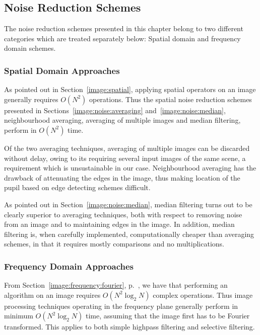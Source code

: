 \subsection{Noise Reduction Schemes}
\label{eval:eval:noise}

The noise reduction schemes presented in this chapter belong to two
different categories which are treated separately below: Spatial
domain and frequency domain schemes.

\subsubsection{Spatial Domain Approaches}

As pointed out in Section~\ref{image:spatial}, applying spatial
operators on an image generally requires $O(N^{2})$ operations.  Thus
the spatial noise reduction schemes presented in
Sections~\ref{image:noise:averaging} and~\ref{image:noise:median},
neighbourhood averaging, averaging of multiple images and median
filtering, perform in $O(N^{2})$ time.

Of the two averaging techniques, averaging of multiple images can be
discarded without delay, owing to its requiring several input images
of the same scene, a requirement which is unsustainable in our case.
Neighbourhood averaging has the drawback of attenuating the edges in
the image, thus making location of the pupil based on edge detecting
schemes difficult.

As pointed out in Section~\ref{image:noise:median}, median filtering
turns out to be clearly superior to averaging techniques, both with
respect to removing noise from an image and to maintaining edges in
the image.  In addition, median filtering is, when carefully
implemented, computationally cheaper than averaging schemes, in that
it requires mostly comparisons and no multiplications.

\subsubsection{Frequency Domain Approaches}

From Section~\ref{image:frequency:fourier}, p.~\pageref{pg:fft:O}, we
have that performing an {\fft} algorithm on an image requires
$O(N^{2}\log_{2}N)$ complex operations.  Thus image processing
techniques operating in the frequency plane generally perform in
minimum $O(N^{2}\log_{2}N)$ time, assuming that the image first has to
be Fourier transformed.  This applies to both simple highpass
filtering and selective filtering.

